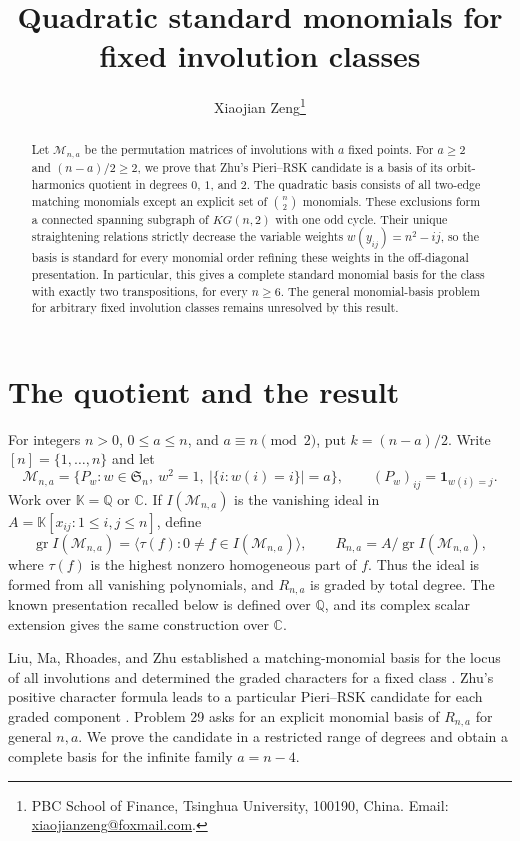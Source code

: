 \documentclass[11pt,a4paper]{article}
\title{Quadratic standard monomials for fixed involution classes}
\author{Xiaojian Zeng\thanks{PBC School of Finance, Tsinghua University,
100190, China. Email: \href{mailto:xiaojianzeng@foxmail.com}{xiaojianzeng@foxmail.com}.}}
\date{}
\newcommand{\kk}{\mathbb{K}}
\newcommand{\QQ}{\mathbb{Q}}
\newcommand{\CC}{\mathbb{C}}
\newcommand{\Mn}{\mathcal{M}_{n,a}}
\DeclareMathOperator{\gr}{gr}
\begin{document}
\maketitle
\begin{abstract}
Let $\mathcal{M}_{n,a}$ be the permutation matrices of involutions with
$a$ fixed points. For $a\geq2$ and $(n-a)/2\geq2$, we prove that Zhu's
Pieri--RSK candidate is a basis of its orbit-harmonics quotient in degrees
$0$, $1$, and $2$. The quadratic basis consists of all two-edge matching
monomials except an explicit set of $\binom n2$ monomials. These exclusions
form a connected spanning subgraph of $KG(n,2)$ with one odd cycle.
Their unique straightening relations strictly decrease the variable weights
$w(y_{ij})=n^2-ij$, so the basis is standard for every monomial order
refining these weights in the off-diagonal presentation. In particular,
this gives a complete standard monomial basis for the class with exactly
two transpositions, for every $n\geq6$. The general monomial-basis problem
for arbitrary fixed involution classes remains unresolved by this result.
\end{abstract}

\section{The quotient and the result}

For integers $n>0$, $0\leq a\leq n$, and $a\equiv n\pmod2$, put
$k=(n-a)/2$. Write $[n]=\{1,\ldots,n\}$ and let
\[
 \Mn=\{P_w:w\in\mathfrak S_n,\ w^2=1,\
                |\{i:w(i)=i\}|=a\},\qquad
 (P_w)_{ij}=\mathbf1_{w(i)=j}.
\]
Work over $\kk=\QQ$ or $\CC$. If $I(\Mn)$ is the vanishing ideal in
$A=\kk[x_{ij}:1\leq i,j\leq n]$, define
\[
 \gr I(\Mn)=\langle\tau(f):0\ne f\in I(\Mn)\rangle,
 \qquad R_{n,a}=A/\gr I(\Mn),
\]
where $\tau(f)$ is the highest nonzero homogeneous part of $f$.
Thus the ideal is formed from all vanishing polynomials, and $R_{n,a}$
is graded by total degree. The known presentation recalled below is
defined over $\QQ$, and its complex scalar extension gives the same
construction over $\CC$.

Liu, Ma, Rhoades, and Zhu established a matching-monomial basis for the
locus of all involutions and determined the graded characters for a fixed
class \cite[Theorems 3.3 and 5.21]{LMRZ}.
Zhu's positive character formula leads to a particular Pieri--RSK
candidate for each graded component \cite[Proposition 17 and the
discussion following Problem 29]{ZhuPositive}. Problem 29 asks for an
explicit monomial basis of $R_{n,a}$ for general $n,a$. We prove the
candidate in a restricted range of degrees and obtain a complete basis
for the infinite family $a=n-4$.
\end{document}
